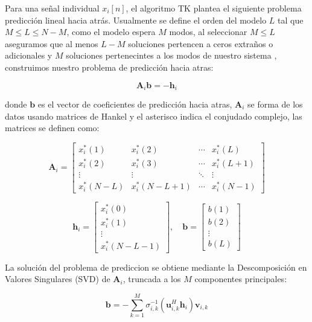 \documentclass[conference]{IEEEtran}
\begin{document}
Para una señal individual $x_i[n]$, el algoritmo TK plantea el siguiente problema predicción lineal hacia atrás. Usualmente se define el orden del modelo $L$ tal que $M \leq L \leq N-M$, como el modelo espera $M$ modos, al seleccionar $M \leq L$ aseguramos que al menos $L-M$ soluciones pertencen a ceros extraños o adicionales y $M$ soluciones pertenecintes a los modos de nuestro sistema \cite{tufts} \cite{moghdam}, construimos nuestro problema de predicción hacia atras:

\begin{equation}
\mathbf{A}_i \mathbf{b} = -\mathbf{h}_i
\end{equation}

donde $\mathbf{b}$ es el vector de coeficientes de predicción hacia atras, $\mathbf{A}_i$ se forma de los datos usando matrices de Hankel y el asterisco indica el conjudado complejo, las matrices se definen como:

\begin{equation}
\mathbf{A}_i = 
\begin{bmatrix}
x_i^*(1) & x_i^*(2) & \cdots & x_i^*(L) \\
x_i^*(2) & x_i^*(3) & \cdots & x_i^*(L+1) \\
\vdots & \vdots & \ddots & \vdots \\
x_i^*(N-L) & x_i^*(N-L+1) & \cdots & x_i^*(N-1)
\end{bmatrix}
\label{eq:A_matrix}
\end{equation}

\begin{equation}
\mathbf{h}_i = 
\begin{bmatrix}
x_i^*(0) \\
x_i^*(1) \\
\vdots \\
x_i^*(N-L-1)
\end{bmatrix}, \quad
\mathbf{b} = 
\begin{bmatrix}
b(1) \\
b(2) \\
\vdots \\
b(L)
\end{bmatrix}
\label{eq:h_b_vectors}
\end{equation}

La solución del problema de prediccion se obtiene mediante la Descomposición en Valores Singulares (SVD) de $\mathbf{A}_i$, truncada a los $M$ componentes principales:

\begin{equation}
\mathbf{b} = -\sum_{k=1}^{M} \sigma_{i,k}^{-1} (\mathbf{u}_{i,k}^H \mathbf{h}_i) \mathbf{v}_{i,k}
\label{eq:single_solution}
\end{equation}
\end{document}
